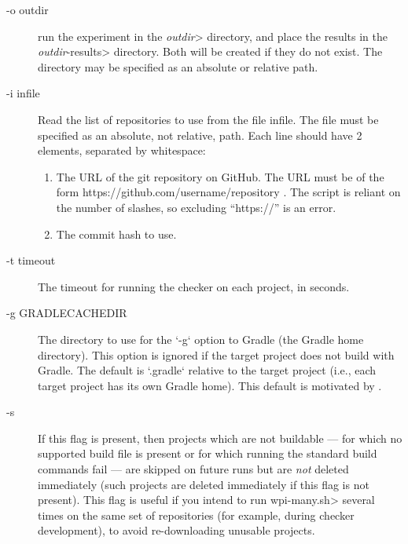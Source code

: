 \begin{description}
\item[-o outdir]
  run the experiment in the \<\emph{outdir}> directory, and place the results in
  the \<\emph{outdir}-results> directory. Both will be created if they do not
  exist.  The directory may be specified as an absolute or relative path.

\item[-i infile]
  Read the list of repositories to use from the file infile.
  The file must be specified as an absolute, not relative, path.
  Each line
  should have 2 elements, separated by whitespace:
  \begin{enumerate}
  \item
    The URL of the git repository on GitHub. The URL must be of the form
    https://github.com/username/repository .  The script is reliant on the
    number of slashes, so excluding ``https://'' is an error.
  \item The commit hash to use.
  \end{enumerate}

\item[-t timeout]
  The timeout for running the checker on each project, in seconds.

\item[-g GRADLECACHEDIR]
  The directory to use for the `-g` option to Gradle (the Gradle home
  directory). This option is ignored if the target project does not
  build with Gradle. The default is `.gradle` relative to the target
  project (i.e., each target project has its own Gradle home). This default
  is motivated by
  .

\item[-s]
  If this flag is present, then projects which are not buildable --- for which
  no supported build file is present or for which running the standard build
  commands fail --- are skipped on future runs but are \emph{not} deleted immediately
  (such projects are deleted immediately if this flag is not present). This flag is useful
  if you intend to run \<wpi-many.sh> several times on the same set of repositories
  (for example, during checker development), to avoid re-downloading unusable projects.

\end{description}



